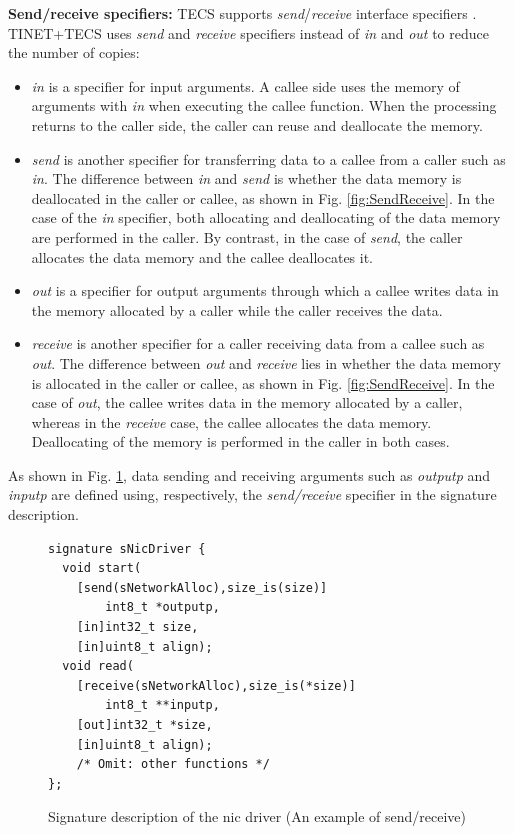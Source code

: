 \documentclass[conference]{IEEEtran/IEEEtran}
\begin{document}
{\bf Send/receive specifiers:}
TECS supports {\it send}/{\it receive} interface specifiers \cite{par:RPC}.
TINET+TECS uses {\it send} and {\it receive} specifiers instead of {\it in} and {\it out} to reduce the number of copies:

\begin{itemize}
\item {\it in} is a specifier for input arguments.
A callee side uses the memory of arguments with {\it in} when executing the callee function.
When the processing returns to the caller side, the caller can reuse and deallocate the memory.

\item {\it send} is another specifier for transferring data to a callee from a caller such as {\it in}.
The difference between {\it in} and {\it send} is whether the data memory is deallocated in the caller or callee, as shown in Fig. \ref{fig:SendReceive}.
In the case of the {\it in} specifier, both allocating and deallocating of the data memory are performed in the caller.
By contrast, in the case of {\it send}, the caller allocates the data memory and the callee deallocates it.

\item {\it out} is a specifier for output arguments through which a callee writes data in the memory allocated by a caller while the caller receives the data.

\item {\it receive} is another specifier for a caller receiving data from a callee such as {\it out}.
The difference between {\it out} and {\it receive} lies in whether the data memory is allocated in the caller or callee, as shown in Fig. \ref{fig:SendReceive}.
In the case of {\it out}, the callee writes data in the memory allocated by a caller, whereas in the {\it receive} case, the callee allocates the data memory.
Deallocating of the memory is performed in the caller in both cases.
\end{itemize}

As shown in Fig. \ref{src:SendReceive}, data sending and receiving arguments such as {\it outputp} and {\it inputp} are defined using, respectively, the {\it send/receive} specifier in the signature description.

\begin{figure}[t]
\centering
\begin{lstlisting}
signature sNicDriver {
  void start(
    [send(sNetworkAlloc),size_is(size)]
        int8_t *outputp,
    [in]int32_t size,
    [in]uint8_t align);
  void read(
    [receive(sNetworkAlloc),size_is(*size)]
        int8_t **inputp,
    [out]int32_t *size,
    [in]uint8_t align);
    /* Omit: other functions */
};
\end{lstlisting}
\vspace{-1mm} \caption{Signature description of the nic driver (An example of send/receive)}
\vspace{-1mm} \label{src:SendReceive}
\end{figure}
\end{document}
